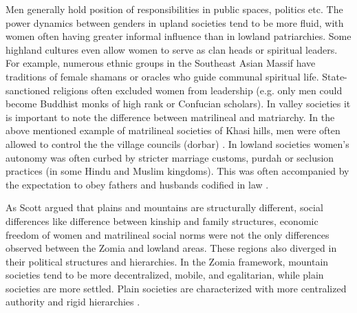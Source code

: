  Men generally hold position of responsibilities in public spaces, politics etc. The power dynamics between genders in upland societies tend to be more fluid, with women often having greater informal influence than in lowland patriarchies. Some highland cultures even allow women to serve as clan heads or spiritual leaders.  For example, numerous ethnic groups in the Southeast Asian Massif have traditions of female shamans or oracles who guide communal spiritual life. State-sanctioned religions often excluded women from leadership (e.g. only men could become Buddhist monks of high rank or Confucian scholars). In valley societies it is important to note the difference between matrilineal and matriarchy. In the above mentioned example of matrilineal societies of Khasi hills, men were often allowed to control the the village councils (dorbar) \citep{WashingtonPost_2015,TheGuardian2011}. In lowland societies women’s autonomy was often curbed by stricter marriage customs, purdah or seclusion practices (in some Hindu and Muslim kingdoms). This was often accompanied by the expectation to obey fathers and husbands codified in law \citep{Papanek_1973,Devi2019}.


As Scott argued that plains and mountains are structurally different, social differences like difference between kinship and family structures, economic freedom of women and matrilineal social norms were not the only differences observed between the Zomia and lowland areas. These regions also diverged in their political structures and hierarchies. In the Zomia framework, mountain societies tend to be more decentralized, mobile, and egalitarian, while plain societies are more settled. Plain societies are characterized with more centralized authority and rigid hierarchies \citep{Hammond_2011}.


